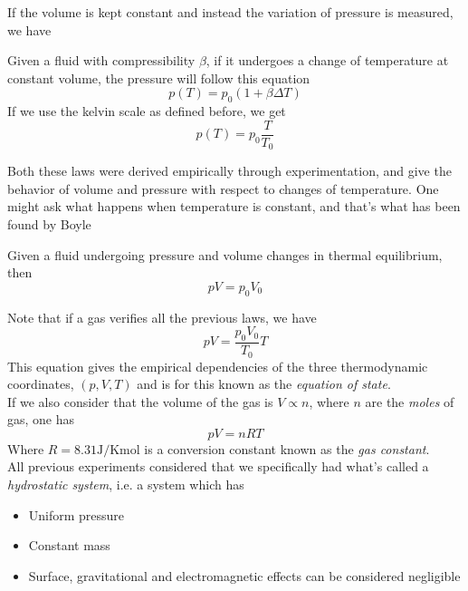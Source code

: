 \documentclass[../qm.tex]{subfiles}
\begin{document}
If the volume is kept constant and instead the variation of pressure is measured, we have
\begin{thm}
	Given a fluid with compressibility $\beta$, if it undergoes a change of temperature at constant volume, the pressure will follow this equation
	\begin{equation}
		p\left( T \right)=p_0\left( 1+\beta\Delta T \right)
		\label{eq:gaylussac2c.temp}
	\end{equation}
	If we use the kelvin scale as defined before, we get
	\begin{equation}
		p\left( T \right)=p_0\frac{T}{T_0}
		\label{eq:gaylussac2k.temp}
	\end{equation}
\end{thm}
Both these laws were derived empirically through experimentation, and give the behavior of volume and pressure with respect to changes of temperature. One might ask what happens when temperature is constant, and that's what has been found by Boyle
\begin{thm}
	Given a fluid undergoing pressure and volume changes in thermal equilibrium, then
	\begin{equation}
		pV=p_0V_0
		\label{eq:boylelaw.temp}
	\end{equation}
\end{thm}
Note that if a gas verifies all the previous laws, we have
\begin{equation}
	pV=\frac{p_0V_0}{T_0}T
	\label{eq:eqstate.temp}
\end{equation}
This equation gives the empirical dependencies of the three thermodynamic coordinates, $\left( p, V, T \right)$ and is for this known as the \textit{equation of state}.\\
If we also consider that the volume of the gas is $V\propto n$, where $n$ are the \textit{moles} of gas, one has
\begin{equation}
	pV=nRT
	\label{eq:idealgaslaw.temp}
\end{equation}
Where $R=8.31\mathrm{ J/Kmol}$ is a conversion constant known as the \textit{gas constant}.\\
All previous experiments considered that we specifically had what's called a \textit{hydrostatic system}, i.e. a system which has
\begin{itemize}
\item Uniform pressure
\item Constant mass
\item Surface, gravitational and electromagnetic effects can be considered negligible
\end{itemize}
\end{document}
